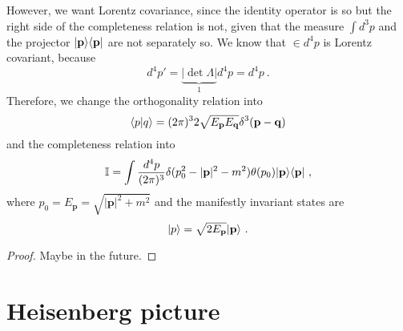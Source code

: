     However, we want Lorentz covariance, since the identity operator is so but the right side of the completeness relation is not, given that the measure $\int d^3 p$ and the projector $\vert\mathbf p\rangle \langle\mathbf p\vert$ are not separately so. We know that $\in d^4 p$ is Lorentz covariant, because 
    \begin{equation*}
        d^4 p' = \underbrace{|\det \Lambda|}_1 d^4 p = d^4 p ~.
    \end{equation*}
    Therefore, we change the orthogonality relation into 
    \begin{equation*}
        \langle p\vert q\rangle = (2\pi)^3 2 \sqrt{E_{\mathbf p} E_{\mathbf q}} \delta^3 (\mathbf p - \mathbf q) 
    \end{equation*}
    and the completeness relation into 
    \begin{equation*}
        \mathbb I = \int \frac{d^4 p}{(2\pi)^3} \delta (p^2_0 - |\mathbf p|^2 - m^2) \theta(p_0) \vert\mathbf p\rangle \langle\mathbf p\vert ~,
    \end{equation*}
    where $p_0 = E_{\mathbf p} = \sqrt{|\mathbf p|^2 + m^2}$ and the manifestly invariant states are 
    \begin{equation}
        \vert p\rangle = \sqrt{2E_{\mathbf p}} \vert\mathbf p\rangle ~.
    \end{equation}
    \begin{proof}
        Maybe in the future.
    \end{proof}

\section{Heisenberg picture}
